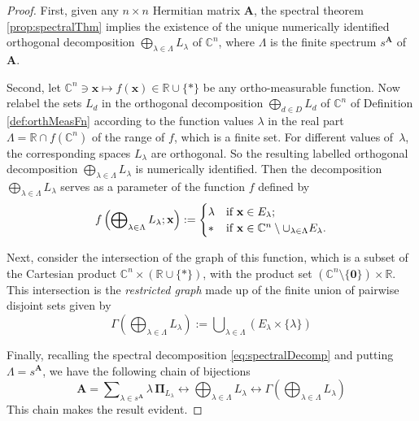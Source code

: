 \documentclass[10pt,a4paper]{amsart}
\newcommand \C { \mathbb{C} }
\newcommand \R { \mathbb{R} }
\begin{document}
\begin{proof}
	First, given any $n \times n$ Hermitian matrix $ \mathbf A$, 
	the spectral theorem \ref{prop:spectralThm} implies the existence 
	of the unique numerically identified orthogonal decomposition 
	 \( \bigoplus\nolimits _{ \lambda \in \Lambda } L_\lambda \) of $ \C^n $,
	 where $ \Lambda $ is the finite spectrum $ s^{ \mathbf A}$ of $ \mathbf A$. 

	Second, let \( \C^n \owns \mathbf x \mapsto f( \mathbf x) \in \R \cup \{*\} \) 
	be any ortho-measurable function.
	Now relabel the sets $ L_d $ 
	in the orthogonal decomposition $ \bigoplus _{d \in D} L_d $ of $ \C^n $ 
	of Definition \ref{def:orthMeasFn} according to the function values $ \lambda $
	in the real part $ \Lambda = \R \cap f( \C^n )$ of the range of $f$, which is a finite set.
	For different values of~$ \lambda $, the corresponding spaces $ L_\lambda $ are orthogonal.
	So the resulting 
	labelled orthogonal decomposition $ \bigoplus _{ \lambda \in \Lambda } L_\lambda $
	is numerically identified.
	Then the decomposition $ \bigoplus _{ \lambda \in \Lambda } L_\lambda $ serves 
	as a parameter of the function $f$ defined by 
\begin{equation} \label{eq:defOMeasFn}
	f \left( \bigoplus\nolimits _{ \lambda \in \Lambda } L_\lambda ; \mathbf x \right) 
	:= \begin{cases} 
	\lambda & \text{if $ \mathbf x \in E_\lambda $}; \\
 	* & \text{if $ \mathbf x \in \C^n \setminus \cup _{ \lambda \in \Lambda } E_\lambda $}.
\end{cases}
\end{equation}
	
	Next, consider the intersection of the graph of this function, 
	which is a subset of the Cartesian product $ \C^n \times ( \R \cup \{*\} )$, 
	with the product set $( \C^n \setminus \{ \mathbf 0\} ) \times \R$. 
	This intersection is the \emph{restricted graph} made up of the finite union 
	of pairwise disjoint sets given by
\begin{equation} \label{eq:graphOMeasFn}
	\Gamma \left( \bigoplus\nolimits _{ \lambda \in \Lambda } L_\lambda \right) 
	:= \bigcup\nolimits _{ \lambda \in \Lambda } \left( E_\lambda \times \{ \lambda \} \right)
\end{equation}
	
	Finally, recalling the spectral decomposition \eqref{eq:spectralDecomp} 
	and putting $ \Lambda = s^{ \mathbf A} $, we have the following chain of bijections
\begin{equation} \label{eq:bijections}
	\mathbf A = \sum\nolimits _{ \lambda \in s^{ \mathbf A} } 
	\lambda \, \boldsymbol \Pi _{ L_\lambda } 
	\longleftrightarrow \bigoplus\nolimits _{ \lambda \in \Lambda } L_\lambda 
	\longleftrightarrow \Gamma \left( \bigoplus\nolimits _{ \lambda \in \Lambda } L_\lambda \right)
\end{equation}
	This chain makes the result evident.
\end{proof}
\end{document}
